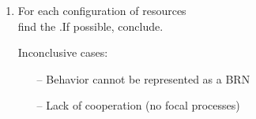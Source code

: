 \begin{frame}
\begin{columns}
\begin{column}{0.2\textwidth}
\end{column}
\begin{column}{0.25\textwidth}


\end{column}
\end{columns}

\bigskip
\pause[2]
\begin{enumerate}[1.]
  \item For each configuration of resources \quad [\ex{$\omega = \{a^+, b^-\}$}]\\
\pause
        find the .\pause[4] If possible, conclude. \quad [$\ex{k_{z,\{a^+, b^-\}} = 1}$]
\pause[5]
 \item[] Inconclusive cases:
  \begin{itemize}
    \item[--] Behavior cannot be represented as a BRN
    \item[--] Lack of cooperation (no focal processes)
  \end{itemize}
\end{enumerate}
\end{frame}

